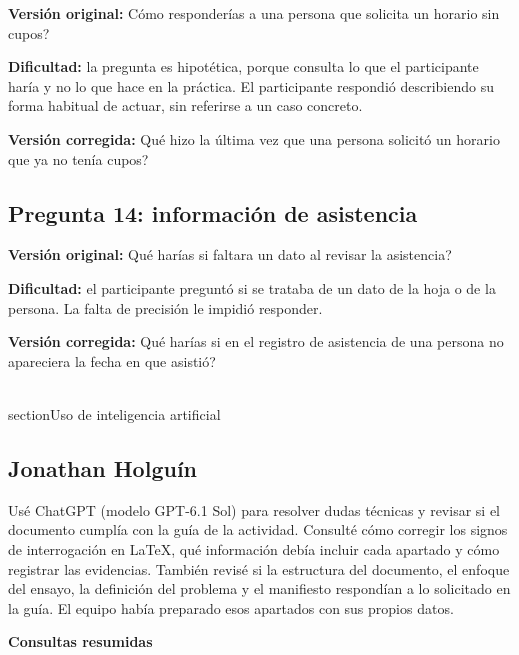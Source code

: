 \documentclass[11pt,a4paper]{article}
\begin{document}
\textbf{Versión original:} \textquestiondown{}Cómo responderías a una persona que solicita un horario sin cupos?

\textbf{Dificultad:} la pregunta es hipotética, porque consulta lo que el participante haría y no lo que hace en la práctica. El participante respondió describiendo su forma habitual de actuar, sin referirse a un caso concreto.

\textbf{Versión corregida:} \textquestiondown{}Qué hizo la última vez que una persona solicitó un horario que ya no tenía cupos?

\subsection*{Pregunta 14: información de asistencia}

\textbf{Versión original:} \textquestiondown{}Qué harías si faltara un dato al revisar la asistencia?

\textbf{Dificultad:} el participante preguntó si se trataba de un dato de la hoja o de la persona. La falta de precisión le impidió responder.

\textbf{Versión corregida:} \textquestiondown{}Qué harías si en el registro de asistencia de una persona no apareciera la fecha en que asistió?

\clearpage
\\section{Uso de inteligencia artificial}

\subsection*{Jonathan Holguín}

Usé ChatGPT (modelo GPT-6.1 Sol) para resolver dudas técnicas y revisar
si el documento cumplía con la guía de la actividad. Consulté cómo
corregir los signos de interrogación en LaTeX, qué información debía
incluir cada apartado y cómo registrar las evidencias. También revisé
si la estructura del documento, el enfoque del ensayo, la definición
del problema y el manifiesto respondían a lo solicitado en la guía.
El equipo había preparado esos apartados con sus propios datos.

\textbf{Consultas resumidas}
\end{document}
